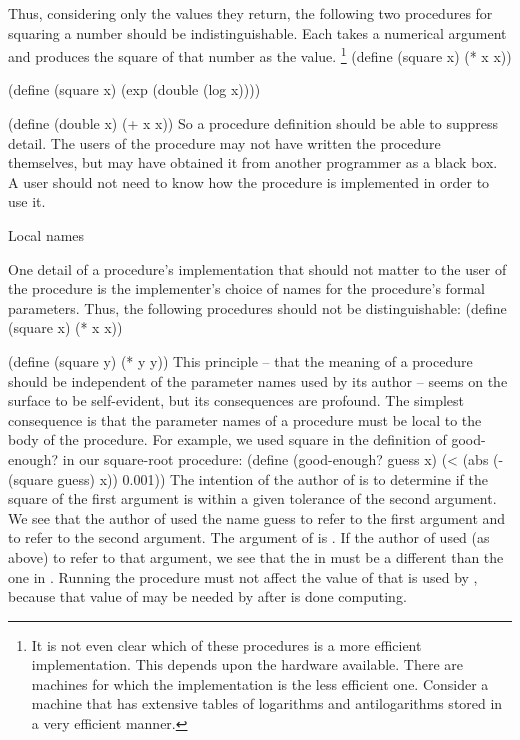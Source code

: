 Thus, considering only the values they return,
the following two procedures for squaring a number should be indistinguishable.
Each takes a numerical argument and produces the square of that number as the value.
\footnote{%
   It is not even clear which of these procedures is a more efficient implementation.
   This depends upon the hardware available.
   There are machines for which the  implementation is the less efficient one.
   Consider a machine that has extensive tables of logarithms and antilogarithms stored in a very efficient manner.
}
\startcode
(define (square x) (* x x))

(define (square x)
  (exp (double (log x))))

(define (double x) (+ x x))
\stopcode
So a procedure definition should be able to suppress detail.
The users of the procedure may not have written the procedure themselves,
but may have obtained it from another programmer as a black box.
A user should not need to know how the procedure is implemented in order to use it.

Local names

One detail of a procedure's implementation that should not matter to the user of the procedure is
the implementer's choice of names for the procedure's formal parameters.
Thus, the following procedures should not be distinguishable:
\startcode
(define (square x) (* x x))

(define (square y) (* y y))
\stopcode
This principle
-- that the meaning of a procedure should be independent of the parameter names used by its author --
seems on the surface to be self-evident,
but its consequences are profound.
The simplest consequence is that the parameter names of a procedure must be local to the body of the procedure.
For example, we used square in the definition of good-enough? in our square-root procedure:
\startcode
(define (good-enough? guess x)
  (< (abs (- (square guess) x)) 0.001))
\stopcode
The intention of the author of  is
to determine if the square of the first argument is within a given tolerance of the second argument.
We see that the author of  used the name guess
to refer to the first argument and  to refer to the second argument.
The argument of  is .
If the author of  used  (as above) to refer to that argument,
we see that the  in  must be a different  than the one in .
Running the procedure  must not affect the value of  that is used by ,
because that value of  may be needed by  after  is done computing.

